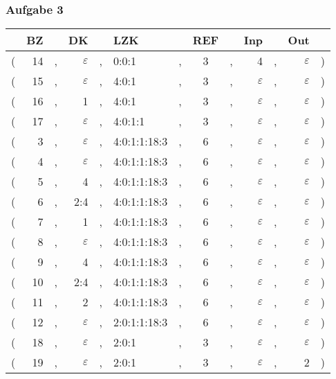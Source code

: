\documentclass[aspectratio=1610,onlymath, ngerman]{beamer}
\renewcommand{\epsilon}{\varepsilon}
\newcommand*\head{\rowfont{\bfseries}}
\begin{document}
	\begin{frame} \frametitle{Aufgabe 3}
	\footnotesize
		\vspace{-6pt}
		\begin{center}
			\begin{tabu}{rrcrclcccrcrl}
				\head & BZ && DK && LZK && REF && Inp && Out & \\ \hline
				( & 14 &,& $\epsilon$ &,& 0:0:1 &,& 3 &,& 4 &,& $\epsilon$ & ) \\
				( & 15 &,& $\epsilon$ &,& 4:0:1 &,& 3 &,& $\epsilon$ &,& $\epsilon$ & ) \\
				( & 16 &,& 1 &,& 4:0:1 &,& 3 &,& $\epsilon$ &,& $\epsilon$ & ) \\
				( & 17 &,& $\epsilon$ &,& 4:0:1:1 &,& 3 &,& $\epsilon$ &,& $\epsilon$ & ) \\
				( & 3 &,& $\epsilon$ &,& 4:0:1:1:18:3 &,& 6 &,& $\epsilon$ &,& $\epsilon$ & ) \\
				( & 4 &,& $\epsilon$ &,& 4:0:1:1:18:3 &,& 6 &,& $\epsilon$ &,& $\epsilon$ & ) \\
				( & 5 &,& 4 &,& 4:0:1:1:18:3 &,& 6 &,& $\epsilon$ &,& $\epsilon$ & ) \\
				( & 6 &,& 2:4 &,& 4:0:1:1:18:3 &,& 6 &,& $\epsilon$ &,& $\epsilon$ & ) \\
				( & 7 &,& 1 &,& 4:0:1:1:18:3 &,& 6 &,& $\epsilon$ &,& $\epsilon$ & ) \\
				( & 8 &,& $\epsilon$ &,& 4:0:1:1:18:3 &,& 6 &,& $\epsilon$ &,& $\epsilon$ & ) \\
				( & 9 &,& 4 &,& 4:0:1:1:18:3 &,& 6 &,& $\epsilon$ &,& $\epsilon$ & ) \\
				( & 10 &,& 2:4 &,& 4:0:1:1:18:3 &,& 6 &,& $\epsilon$ &,& $\epsilon$ & ) \\
				( & 11 &,& 2 &,& 4:0:1:1:18:3 &,& 6 &,& $\epsilon$ &,& $\epsilon$ & ) \\
				( & 12 &,& $\epsilon$ &,& 2:0:1:1:18:3 &,& 6 &,& $\epsilon$ &,& $\epsilon$ & ) \\
				( & 18 &,& $\epsilon$ &,& 2:0:1 &,& 3 &,& $\epsilon$ &,& $\epsilon$ & ) \\
				( & 19 &,& $\epsilon$ &,& 2:0:1 &,& 3 &,& $\epsilon$ &,& 2 & ) \\
			\end{tabu}
		\end{center}
	\end{frame}
\end{document}
